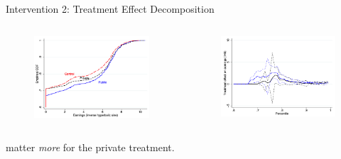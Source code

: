\begin{frame}{Intervention 2: Treatment Effect Decomposition}
    \begin{columns}[T]
        \begin{column}{0.45\textwidth}
            \begin{figure}
                \centering
                \includegraphics[width = 0.95 \textwidth]{images/T2_dist.png}
            \end{figure}
        \end{column}

        \begin{column}{0.45\textwidth}
            \begin{figure}
                \centering
                \includegraphics[width = 0.95 \textwidth]{images/T2_quanttreat.png}
            \end{figure}
        \end{column}
    \end{columns}

    \vspace*{10pt}
     matter \textit{more} for the private treatment.
    \vspace*{10pt}
\end{frame}
